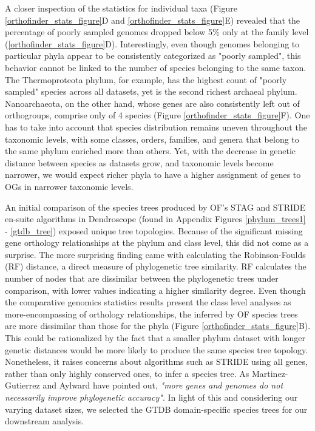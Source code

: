 A closer inspection of the statistics for individual taxa (Figure \ref{orthofinder_stats_figure}D and \ref{orthofinder_stats_figure}E) revealed that the percentage of poorly sampled genomes dropped below 5\% only at the family level (\ref{orthofinder_stats_figure}D). Interestingly, even though genomes belonging to particular phyla appear to be consistently categorized as "poorly sampled", this behavior cannot be linked to the number of species belonging to the same taxon. The Thermoproteota phylum, for example, has the highest count of "poorly sampled" species across all datasets, yet is the second richest archaeal phylum. Nanoarchaeota, on the other hand, whose genes are also consistently left out of orthogroups, comprise only of 4 species (Figure \ref{orthofinder_stats_figure}F). One has to take into account that species distribution remains uneven throughout the taxonomic levels, with some classes, orders, families, and genera that belong to the same phylum enriched more than others. Yet, with the decrease in genetic distance between species as datasets grow, and taxonomic levels become narrower, we would expect richer phyla to have a higher assignment of genes to OGs in narrower taxonomic levels.  

An initial comparison of the species trees produced by OF's STAG \cite{emms2018} and STRIDE \cite{emms2017} en-suite algorithms in Dendroscope \cite{huson2012} (found in Appendix Figures \ref{phylum_trees1} - \ref{gtdb_tree}) exposed unique tree topologies. Because of the significant missing gene orthology relationships at the phylum and class level, this did not come as a surprise. The more surprising finding came with calculating the Robinson-Foulds (RF) distance, a direct measure of phylogenetic tree similarity. RF calculates the number of nodes that are dissimilar between the phylogenetic trees under comparison, with lower values indicating a higher similarity degree. Even though the comparative genomics statistics results present the class level analyses as more-encompassing of orthology relationships, the inferred by OF species trees are more dissimilar than those for the phyla (Figure \ref{orthofinder_stats_figure}B). This could be rationalized by the fact that a smaller phylum dataset with longer genetic distances would be more likely to produce the same species tree topology. Nonetheless, it raises concerns about algorithms such as STRIDE using all genes, rather than only highly conserved ones, to infer a species tree. As Martinez-Gutierrez and Aylward \cite{martinez-gutierrez2021} have pointed out, \textit{"more genes and genomes do not necessarily improve phylogenetic accuracy"}. In light of this and considering our varying dataset sizes, we selected the GTDB domain-specific species trees for our downstream analysis.

